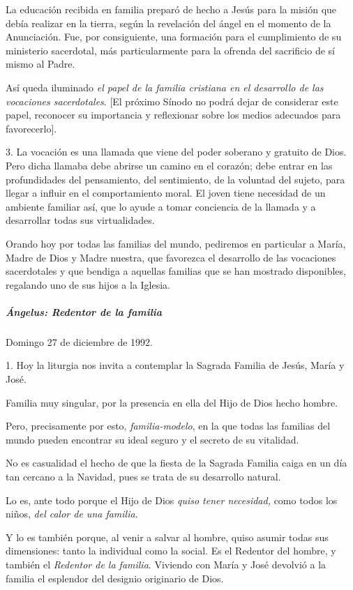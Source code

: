 \documentclass[]{article}
\let\oldsubparagraph\subparagraph
\renewcommand{\subparagraph}[1]{\oldsubparagraph{#1}\mbox{}}
\begin{document}
La educación recibida en familia preparó de hecho a Jesús para la misión
que debía realizar en la tierra, según la revelación del ángel en el
momento de la Anunciación. Fue, por consiguiente, una formación para el
cumplimiento de su ministerio sacerdotal, más particularmente para la
ofrenda del sacrificio de sí mismo al Padre.

Así queda iluminado \emph{el papel de la familia cristiana en el
desarrollo de las vocaciones sacerdotales}. {[}El próximo Sínodo no
podrá dejar de considerar este papel, reconocer su importancia y
reflexionar sobre los medios adecuados para favorecerlo{]}.

3. La vocación es una llamada que viene del poder soberano y gratuito de
Dios. Pero dicha llamaba debe abrirse un camino en el corazón; debe
entrar en las profundidades del pensamiento, del sentimiento, de la
voluntad del sujeto, para llegar a influir en el comportamiento moral.
El joven tiene necesidad de un ambiente familiar así, que lo ayude a
tomar conciencia de la llamada y a desarrollar todas sus virtualidades.

Orando hoy por todas las familias del mundo, pediremos en particular a
María, Madre de Dios y Madre nuestra, que favorezca el desarrollo de las
vocaciones sacerdotales y que bendiga a aquellas familias que se han
mostrado disponibles, regalando uno de sus hijos a la Iglesia.

\subparagraph{Ángelus: Redentor de la
familia}\label{uxe1ngelus-redentor-de-la-familia}

Domingo 27 de diciembre de 1992.

1. Hoy la liturgia nos invita a contemplar la Sagrada Familia de Jesús,
María y José.

Familia muy singular, por la presencia en ella del Hijo de Dios hecho
hombre.

Pero, precisamente por esto, \emph{familia-modelo}, en la que todas las
familias del mundo pueden encontrar su ideal seguro y el secreto de su
vitalidad.

No es casualidad el hecho de que la fiesta de la Sagrada Familia caiga
en un día tan cercano a la Navidad, pues se trata de su desarrollo
natural.

Lo es, ante todo porque el Hijo de Dios \emph{quiso tener necesidad,}
como todos los niños, \emph{del calor de una familia}.

Y lo es también porque, al venir a salvar al hombre, quiso asumir todas
sus dimensiones: tanto la individual como la social. Es el Redentor del
hombre, y también el \emph{Redentor de la familia}. Viviendo con María y
José devolvió a la familia el esplendor del designio originario de Dios.
\end{document}
